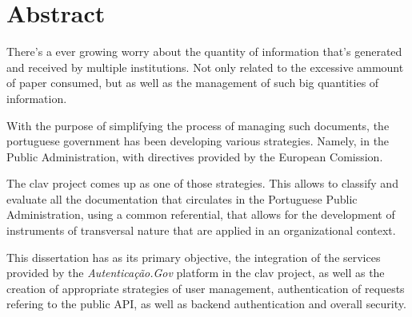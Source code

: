 \chapter*{Abstract}

There's a ever growing worry about the quantity of information that's generated and received by multiple institutions. Not only related to the excessive ammount of paper consumed, but as well as the management of such big quantities of information.

With the purpose of simplifying the process of managing such documents, the portuguese government has been developing various strategies. Namely, in the Public Administration, with directives provided by the European Comission.

The \gls{clav} project comes up as one of those strategies. This allows to classify and evaluate all the documentation that circulates in the Portuguese Public Administration, using a common referential, that allows for the development of instruments of transversal nature that are applied in an organizational context.

This dissertation has as its primary objective, the integration of the services provided by the \emph{Autenticação.Gov} platform in the \gls{clav} project, as well as the creation of appropriate strategies of user management, authentication of requests refering to the public API, as well as  backend authentication and overall security.

\vspace{5cm}
